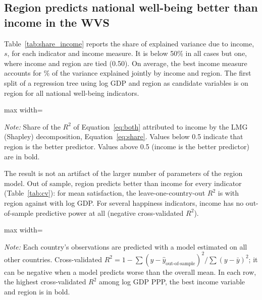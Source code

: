 \documentclass[12pt]{article}
\begin{document}
\subsection{Region predicts national well-being better than income in the WVS}\label{subsec:region_wvs}

Table~\ref{tab:share_income} reports the share of explained variance due to income, $s$, for each indicator and income measure. It is below 50\% in all cases but one, where income and region are tied (0.50). On average, the best income measure accounts for \meanShareIncomeBest\% of the variance explained jointly by income and region. The first split of a regression tree using log GDP and region as candidate variables is on region for all %
national well-being indicators.

\begin{table}[htbp]
    \centering
    \caption{Share of explained variance due to income rather than region (LMG), WVS/EVS 1981--2023.}\label{tab:share_income}
    \begin{adjustbox}{max width=\textwidth}
    
    \end{adjustbox}
    \begin{minipage}{\textwidth}\footnotesize \textit{Note:} Share of the $R^2$ of Equation~\eqref{eq:both} attributed to income by the LMG (Shapley) decomposition, Equation~\eqref{eq:share}. Values below 0.5 indicate that region is the better predictor. Values above 0.5 (income is the better predictor) are in bold.\end{minipage}
\end{table}

The result is not an artifact of the larger number of parameters of the region model. Out of sample, region predicts better than income for every indicator (Table~\ref{tab:cv}): for mean satisfaction, the leave-one-country-out $R^2$ is \cvRegionSatisfiedMean with region against \cvIncomeSatisfiedMean with log GDP. For several happiness indicators, income has no out-of-sample predictive power at all (negative cross-validated $R^2$).

\begin{table}[htbp]
    \centering
    \caption{Out-of-sample predictive capacity: leave-one-country-out cross-validated $R^2$.}\label{tab:cv}
    \begin{adjustbox}{max width=\textwidth}
    
    \end{adjustbox}
    \begin{minipage}{\textwidth}\footnotesize \textit{Note:} Each country's observations are predicted with a model estimated on all other countries. Cross-validated $R^2 = 1 - \sum (y - \hat y_{\text{out-of-sample}})^2 / \sum (y - \bar y)^2$; it can be negative when a model predicts worse than the overall mean. In each row, the highest cross-validated $R^2$ among log GDP PPP, the best income variable and region is in bold.\end{minipage}
\end{table}
\end{document}
